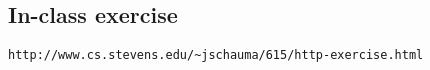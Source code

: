 \documentclass[xga]{xdvislides}
\begin{document}
\subsection{In-class exercise}
\vspace{1in}
\verb+http://www.cs.stevens.edu/~jschauma/615/http-exercise.html+


\end{document}
